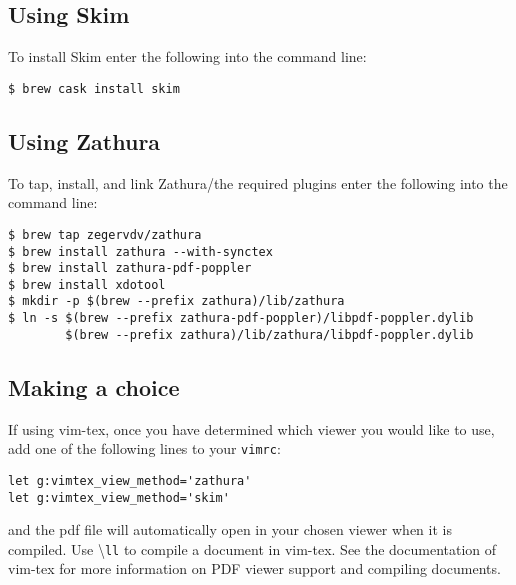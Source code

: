\documentclass{amsart}
\begin{document}
\subsection{Using Skim}

To install Skim enter the following into the command line:
\begin{center}
\begin{verbatim}
$ brew cask install skim
\end{verbatim}
\end{center}

\subsection{Using Zathura}

To tap, install, and link Zathura/the required plugins 
enter the following into the command line:
\begin{center}
\begin{verbatim}
$ brew tap zegervdv/zathura
$ brew install zathura --with-synctex
$ brew install zathura-pdf-poppler
$ brew install xdotool
$ mkdir -p $(brew --prefix zathura)/lib/zathura
$ ln -s $(brew --prefix zathura-pdf-poppler)/libpdf-poppler.dylib 
        $(brew --prefix zathura)/lib/zathura/libpdf-poppler.dylib
\end{verbatim}
\end{center}

\subsection{Making a choice}

If using vim-tex, once you have determined which viewer you would like to use, add one of the following
lines to your \texttt{vimrc}:
\begin{verbatim}
let g:vimtex_view_method='zathura'
let g:vimtex_view_method='skim'
\end{verbatim}
and the pdf file will automatically open in your chosen viewer when it is compiled.
Use \textbackslash\texttt{ll} to compile a document in vim-tex.
See the documentation of vim-tex for more information on PDF viewer support and compiling
documents.
\end{document}
